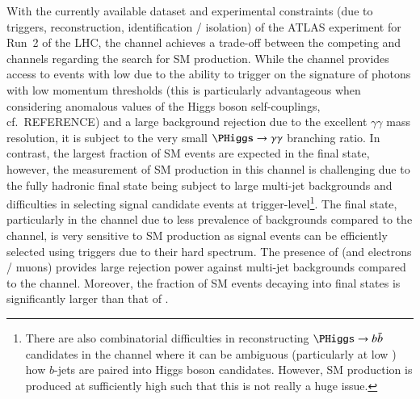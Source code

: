 With the currently available dataset and experimental constraints (due to
triggers, reconstruction, identification / isolation) of the ATLAS experiment
for Run~2 of the LHC, the \bbtautau channel achieves a trade-off between the
competing \bbyy and \bbbb channels regarding the search for SM \HH
production. While the \bbyy channel provides access to events with low \mHH due
to the ability to trigger on the signature of photons with low momentum
thresholds (this is particularly advantageous when considering anomalous values
of the Higgs boson self-couplings, cf.~REFERENCE) and a large background
rejection due to the excellent $\gamma\gamma$ mass resolution, it is subject to
the very small $\PHiggs \to \gamma\gamma$ branching ratio. In contrast, the
largest fraction of SM \HH events are expected in the \bbbb final state,
however, the measurement of SM \HH production in this channel is challenging due
to the fully hadronic final state being subject to large multi-jet backgrounds
and difficulties in selecting signal candidate events at
trigger-level\footnote{There are also combinatorial difficulties in
  reconstructing $\PHiggs \to \bbbar$ candidates in the \bbbb channel where it
  can be ambiguous (particularly at low \mHH) how $b$-jets are paired into Higgs
  boson candidates. However, SM \HH production is produced at sufficiently high
  \mHH such that this is not really a huge issue.}. The \bbtautau final state,
particularly in the \hadhad channel due to less prevalence of \ttbar backgrounds
compared to the \lephad channel, is very sensitive to SM \HH production as
signal events can be efficiently selected using \tauhadvis triggers due to their
hard \mHH spectrum. The presence of \tauhadvis (and electrons / muons) provides
large rejection power against multi-jet backgrounds compared to the \bbbb
channel. Moreover, the fraction of SM \HH events decaying into \bbtautau final
states is significantly larger than that of \bbyy.

